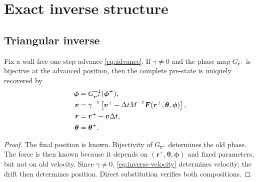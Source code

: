 \section{Exact inverse structure}
\label{sec:inverse}

\subsection{Triangular inverse}

\begin{theorem}
\label{thm:inverse}
Fix a wall-free one-step advance \cref{eq:advance}. If \(\gamma\neq0\) and the phase map \(G_{\bm r^+}\) is bijective at the advanced position, then the complete pre-state is uniquely recovered by
\begin{subequations}
\label{eq:inverse}
\begin{align}
\bm\phi
  &=G_{\bm r^+}^{-1}(\bm\phi^+),
  \label{eq:inverse-phase}\\
\bm v
  &=\gamma^{-1}
  \left[
  \bm v^+
  -\Delta t M^{-1}
  \bm F(\bm r^+,\bm\theta,\bm\phi)
  \right],
  \label{eq:inverse-velocity}\\
\bm r
  &=\bm r^+-\bm v\Delta t,
  \label{eq:inverse-position}\\
\bm\theta&=\bm\theta^+.
\end{align}
\end{subequations}
\end{theorem}

\begin{proof}
The final position is known. Bijectivity of \(G_{\bm r^+}\) determines the old phase. The force is then known because it depends on \((\bm r^+,\bm\theta,\bm\phi)\) and fixed parameters, but not on old velocity. Since \(\gamma\neq0\), \cref{eq:inverse-velocity} determines velocity; the drift then determines position. Direct substitution verifies both compositions.
\end{proof}

